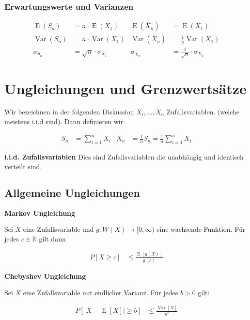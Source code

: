 \documentclass[25pt]{sciposter}
\newcommand{\R}{\mathbb{R}}
\newcommand{\Var}{\operatorname{Var}}
\newcommand{\E}{\operatorname{E}}
\newenvironment{method}[1]{\begin{mdframed}[backgroundcolor=blue!10,innertopmargin=15pt, innerbottommargin=15pt,nobreak=true]
		\textbf{#1 }
	}
	{ 
	\end{mdframed}
}
\begin{document}
\begin{multicols}{3}
\subsubsection*{Erwartungswerte und Varianzen}
\begin{align*}
\E(S_n) &= n \cdot \E(X_1) & \E(\overline{X}_n) &= \E(X_1) \\
\Var(S_n) &= n \cdot \Var(X_1) & \Var(\overline{X}_n) &= \tfrac{1}{n} \Var(X_1) \\
\sigma_{S_n} &= \sqrt{n} \cdot \sigma_{X_1} & \sigma_{\overline{X}_n} &= \tfrac{1}{\sqrt{n}} \cdot \sigma_{X_1}
\end{align*}


\newpage

\section{Ungleichungen und Grenzwertsätze}

Wir bezeichnen in der folgenden Diskussion $X_i, \ldots, X_n$ Zufallsvariablen. (welche meistens i.i.d sind). Dann definieren wir

\begin{align*}
	S_n &= \sum_{i=1}^{n} X_i & \overline{X_n} &= \frac{1}{n}S_n = \frac{1}{n}\sum_{i=1}^{n}X_i
\end{align*}

\textbf{i.i.d. Zufallsvariablen} Dies sind Zufallsvariablen die unabhängig und identisch verteilt sind. 

\subsection*{Allgemeine Ungleichungen}

\begin{method}{Markov Ungleichung}
	Sei $X$ eine Zufallsvariable und $g:W(X)\to [0,\infty)$ eine wachsende Funktion. Für jedes $c\in\R$ gilt dann 
	
	\begin{align*}
		P[X \geq c] &\leq \frac{\E[g(X)]}{g(c)}
	\end{align*}
\end{method}


\begin{method}{Chebyshev Ungleichung}
	Sei $X$ eine Zufallsvariable mit endlicher Varianz. Für jedes $b>0$ gilt:
	
	\begin{align*}
		P[|X-\E[X]| \geq b] &\leq \frac{\Var[X]}{b^2}
	\end{align*}
\end{method}



\end{multicols}
\end{document}
